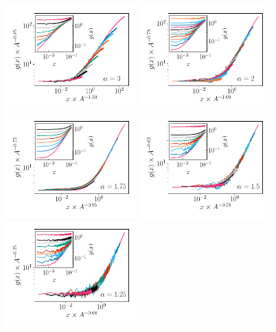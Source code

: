 \begin{figure}[h]
\centering
\includegraphics[width=0.45\textwidth]{Chapitre3/Figures/Interpretation/PCorr/PCorr_rescaled_alpha3_mean.pdf}
\includegraphics[width=0.45\textwidth]{Chapitre3/Figures/Interpretation/PCorr/PCorr_rescaled_alpha2_mean.pdf}
\includegraphics[width=0.45\textwidth]{Chapitre3/Figures/Interpretation/PCorr/PCorr_rescaled_alpha175_mean.pdf}
\includegraphics[width=0.45\textwidth]{Chapitre3/Figures/Interpretation/PCorr/PCorr_rescaled_alpha15_mean.pdf}
\includegraphics[width=0.45\textwidth]{Chapitre3/Figures/Interpretation/PCorr/PCorr_rescaled_alpha125_mean.pdf}

\end{figure}
